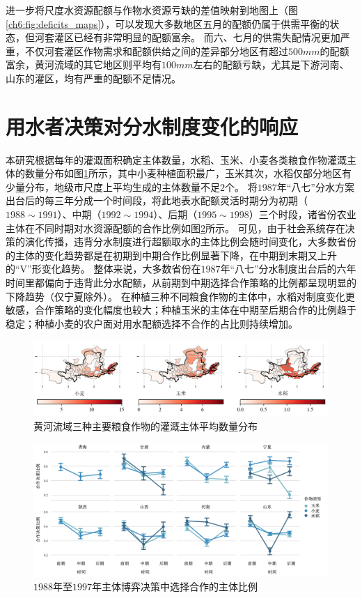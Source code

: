进一步将尺度水资源配额与作物水资源亏缺的差值映射到地图上（图\ref{ch6:fig:deficits_maps}），可以发现大多数地区五月的配额仍属于供需平衡的状态，但河套灌区已经有非常明显的配额富余。
而六、七月的供需失配情况更加严重，不仅河套灌区作物需求和配额供给之间的差异部分地区有超过$500mm$的配额富余，黄河流域的其它地区则平均有$100mm$左右的配额亏缺，尤其是下游河南、山东的灌区，均有严重的配额不足情况。

\section{用水者决策对分水制度变化的响应}

本研究根据每年的灌溉面积确定主体数量，水稻、玉米、小麦各类粮食作物灌溉主体的数量分布如图\ref{ch6:fig:agents}所示，其中小麦种植面积最广，玉米其次，水稻仅部分地区有少量分布，地级市尺度上平均生成的主体数量不足$2$个。
将$1987$年“八七”分水方案出台后的每三年分成一个时间段，将此地表水配额灵活时期分为初期（$1988 \sim 1991$）、中期（$1992 \sim 1994$）、后期（$1995 \sim 1998$）三个时段，诸省份农业主体在不同时期对水资源配额的合作比例如图\ref{ch6:fig:compliacne}所示。
可见，由于社会系统存在决策的演化传播，违背分水制度进行超额取水的主体比例会随时间变化，大多数省份的主体的变化趋势都是在初期到中期合作比例显著下降，在中期到末期又上升的“V”形变化趋势。
整体来说，大多数省份在$1987$年“八七”分水制度出台后的六年时间里都偏向于违背此分水配额，从前期到中期选择合作策略的比例都呈现明显的下降趋势（仅宁夏除外）。
在种植三种不同粮食作物的主体中，水稻对制度变化更敏感，合作策略的变化幅度也较大；种植玉米的主体在中期至后期合作的比例趋于稳定；种植小麦的农户面对用水配额选择不合作的占比则持续增加。

\begin{figure}[htb]
    \centering
    \includegraphics[width=\textwidth]{img/ch6/ch6_agents.png}
    \caption{黄河流域三种主要粮食作物的灌溉主体平均数量分布}\label{ch6:fig:agents}
\end{figure}

\begin{figure}[htb]
    \centering
    \includegraphics[width=\textwidth]{img/ch6/ch6_compliance.png}
    \caption{$1988$年至$1997$年主体博弈决策中选择合作的主体比例}\label{ch6:fig:compliacne}
\end{figure}

